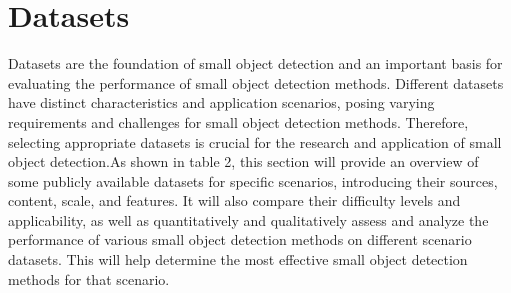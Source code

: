 \documentclass[journal]{IEEEtran}
\begin{document}
\section{Datasets}

Datasets are the foundation of small object detection and an important basis for evaluating the performance of small object detection methods. Different datasets have distinct characteristics and application scenarios, posing varying requirements and challenges for small object detection methods. Therefore, selecting appropriate datasets is crucial for the research and application of small object detection.As shown in table 2, this section will provide an overview of some publicly available datasets for specific scenarios, introducing their sources, content, scale, and features. It will also compare their difficulty levels and applicability, as well as quantitatively and qualitatively assess and analyze the performance of various small object detection methods on different scenario datasets. This will help determine the most effective small object detection methods for that scenario.
\end{document}
